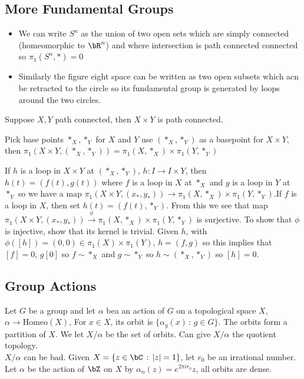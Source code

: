 
\subsection{More Fundamental Groups}

\begin{itemize}
    \item We can write $S^n$ as the union of two open sets which are simply connected (homeomorphic to $\bR^n$) and where intersection is path connected connected so $\pi_1(S^n, *)=0$ 
    \item Similarly the figure eight space can be written as two open subsets which acn be retracted to the circle so its fundamental group is generated by loops around the two circles. 
\end{itemize}

\noindent
Suppose $X,Y$ path connected, then $X \times Y$ is path connected. 

\begin{theorem}
    Pick base points $*_X, *_Y$ for $X$ and $Y$ use $(*_X, *_Y)$ as a basepoint for $X \times Y$, then $\pi_1(X \times Y, (*_X, *_Y)) = \pi_1(X, *_X) \times \pi_1(Y, *_Y)$ 
\end{theorem}

\begin{pf}
    If $h$ is a loop in $X \times Y$ at $(*_X, *_Y)$, $h: I \to I \times Y$, then $h(t) = (f(t), g(t))$ where $f$ is a loop in $X$ at $*_X$ and $g$ is a loop in $Y$ at $*_Y$ so we have a map $\pi_1(X \times Y, (x_*, y_*)) \to \pi_1(X, *_X) \times \pi_1(Y, *_Y)$.If $f$ is a loop in $X$, then set $h(t) = (f(t), *_Y)$. From this we see that map $\pi_1(X \times Y, (x_*, y_*)) \stackrel{\phi}{\to} \pi_1(X, *_X) \times \pi_1(Y, *_Y)$ is surjective. To show that $\phi$ is injective, show that its kernel is trivial. Given $h$, with $\phi([h]) = (0,0) \in \pi_1(X) \times \pi_1(Y)$, $h=(f,g)$ so this implies that $[f]=0$, $g[0]$ so $f \sim *_X$ and $g \sim *_Y$ so $h \sim (*_X, *_Y)$ so $[h]=0$. 
\end{pf}

\subsection{Group Actions}

Let $G$ be a group and let $\alpha$ bea an action of $G$ on a topological space $X$, $\alpha \to \text{Homeo}(X)$, For $x \in X$, its orbit is $\{ \alpha_g(x) \, : \, g \in G\}$. The orbits form a partition of $X$. We let $X/\alpha$ be the set of orbits. Can give $X/\alpha$ the quotient topology. \\
$X/\alpha$ can be bad. Given $X = \{z \in \bC \, : \, |z| =1\}$, let $r_0$ be an irrational number. Let $\alpha$ be the action of $\bZ$ on $X$ by $\alpha_n(z) = e^{2 \pi i r_0}z$, all orbits are dense. 

